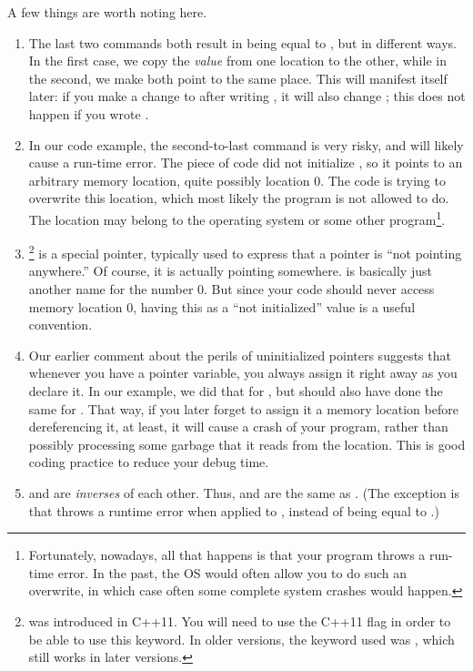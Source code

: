 A few things are worth noting here.
\begin{enumerate}
\item The last two commands both result in  being equal to
, but in different ways. In the first case, we copy the
\emph{value} from one location to the other, while in the second, 
we make both point to the same place.
This will manifest itself later: if you make a change to 
after writing , it will also change ;
this does not happen if you wrote .
\item In our code example, the second-to-last command is very risky,
  and will likely cause a run-time error.
  The piece of code did not initialize ,
  so it points to an arbitrary memory location, quite possibly location 0.
  The code is trying to overwrite this location,
  which most likely the program is not allowed to do.
  The location may belong to the operating system or
  some other program\footnote{Fortunately, nowadays, all that happens
    is that your program throws a run-time error. In the past, the OS
    would often allow you to do such an overwrite, in which case often
    some complete system crashes would happen.}.
\item {}\footnote{ was introduced in
    C++11. You will need to use the C++11 flag in order to be able to
    use this keyword. In older versions, the keyword used was
    , which still works in later versions.} is a special
  pointer, typically used to express that a pointer is ``not pointing
  anywhere.'' Of course, it is actually pointing somewhere.
   is basically just another name for the number 0.
  But since your code should never access memory location 0,
  having this as a ``not initialized'' value is a useful convention.
\item Our earlier comment about the perils of
  uninitialized pointers suggests that whenever you have a pointer
  variable, you always assign it  right away as you declare
  it. In our example, we did that for , but should also have
  done the same for .
  That way, if you later forget to assign it a memory location before
  dereferencing it, at least, it will cause a crash of your program,
  rather than possibly processing some garbage that it reads from the
  location.
  This is good coding practice to reduce your debug time.
\item \code{\&} and \code{*} are \emph{inverses} of each other.
  Thus,  and  are the same as .
  (The exception is that  throws a runtime error when applied
  to , instead of being equal to .)
\end{enumerate}


